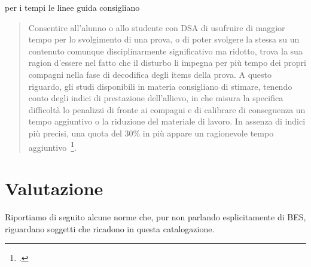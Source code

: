 per i tempi le linee guida consigliano 
\begin{quote}
		\begin{description}[style=sameline]
			\item %
			
			\mancatesto Consentire all'alunno o allo studente con DSA di usufruire di maggior tempo per
			lo svolgimento di una prova, o di poter svolgere la stessa su un contenuto comunque
			disciplinarmente significativo ma ridotto, trova la sua ragion d'essere nel fatto che il disturbo li
			impegna per più tempo dei propri compagni nella fase di decodifica degli items della prova. A
			questo riguardo, gli studi disponibili in materia consigliano di stimare, tenendo conto degli indici di
			prestazione dell'allievo, in che misura la specifica difficoltà lo penalizzi di fronte ai compagni e di
			calibrare di conseguenza un tempo aggiuntivo o la riduzione del materiale di lavoro. In assenza di
			indici più precisi, una quota del 30\% in più appare un ragionevole tempo aggiuntivo~\footcite{LineGuida2011}\mancatesto.
		\end{description}
\end{quote}
\section{Valutazione}
\label{sub:valutazione}
Riportiamo di seguito alcune norme che, pur non parlando esplicitamente di BES, riguardano soggetti che ricadono in questa catalogazione.
